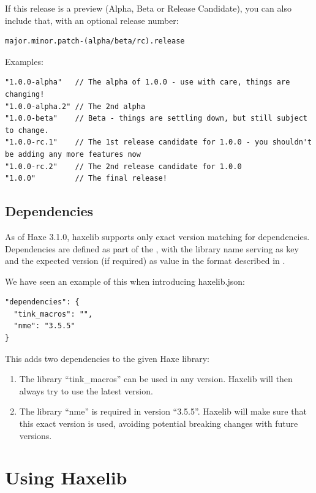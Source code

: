 \documentclass{haxe}
\begin{document}
If this release is a preview (Alpha, Beta or Release Candidate), you can also include that, with an optional release number:

\begin{lstlisting}
major.minor.patch-(alpha/beta/rc).release
\end{lstlisting}

Examples:

\begin{lstlisting}
"1.0.0-alpha"   // The alpha of 1.0.0 - use with care, things are changing!
"1.0.0-alpha.2" // The 2nd alpha
"1.0.0-beta"    // Beta - things are settling down, but still subject to change.
"1.0.0-rc.1"    // The 1st release candidate for 1.0.0 - you shouldn't be adding any more features now
"1.0.0-rc.2"    // The 2nd release candidate for 1.0.0
"1.0.0"         // The final release!  
\end{lstlisting}


\subsection{Dependencies}
\label{haxelib-json-dependencies}

As of Haxe 3.1.0, haxelib supports only exact version matching for dependencies. Dependencies are defined as part of the , with the library name serving as key and the expected version (if required) as value in the format described in .

We have seen an example of this when introducing haxelib.json:

\begin{lstlisting}
"dependencies": {
  "tink_macros": "",
  "nme": "3.5.5"
}
\end{lstlisting}

This adds two dependencies to the given Haxe library:

\begin{enumerate}
	\item The library ``tink_macros'' can be used in any version. Haxelib will then always try to use the latest version.
	\item The library ``nme'' is required in version ``3.5.5''. Haxelib will make sure that this exact version is used, avoiding potential breaking changes with future versions.
\end{enumerate}


\section{Using Haxelib}
\label{haxelib-using}
\end{document}
